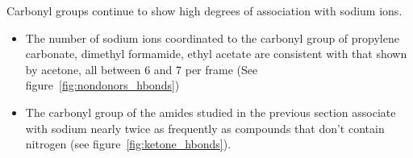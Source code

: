 \documentclass{article}
\begin{document}
  \noindent Carbonyl groups continue to show high degrees of association with
  sodium ions. 
  \begin{itemize}
    \item The number of sodium ions coordinated to the carbonyl group of 
    propylene carbonate, dimethyl formamide, ethyl acetate are consistent with 
    that shown by acetone, all between 6 and 7 per frame (See 
    figure~\ref{fig:nondonors_hbonds})
    \item The carbonyl group of the amides studied in the previous section
    associate with sodium nearly twice as frequently as compounds that don't
    contain nitrogen (see figure~\ref{fig:ketone_hbonds}).
  \end{itemize}
 
\end{document}

